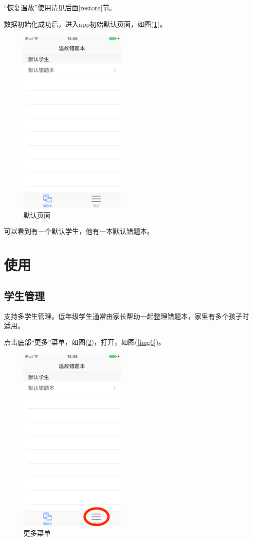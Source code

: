 “恢复温故”使用请见后面\ref{restore}节。

数据初始化成功后，进入app初始默认页面，如图(\ref{img4})。
\begin{figure}[H]
	\centering
	\includegraphics{img/4.png}
	\caption{默认页面}
	\label{img4}
\end{figure}

可以看到有一个默认学生，他有一本默认错题本。

\section{使用}
\subsection{学生管理}
支持多学生管理。低年级学生通常由家长帮助一起整理错题本，家里有多个孩子时适用。

点击底部“更多”菜单，如图(\ref{img5})，打开，如图(\ref{img6})。
\begin{figure}[H]
	\centering
	\includegraphics{img/5.png}
	\caption{更多菜单}
	\label{img5}
\end{figure}

